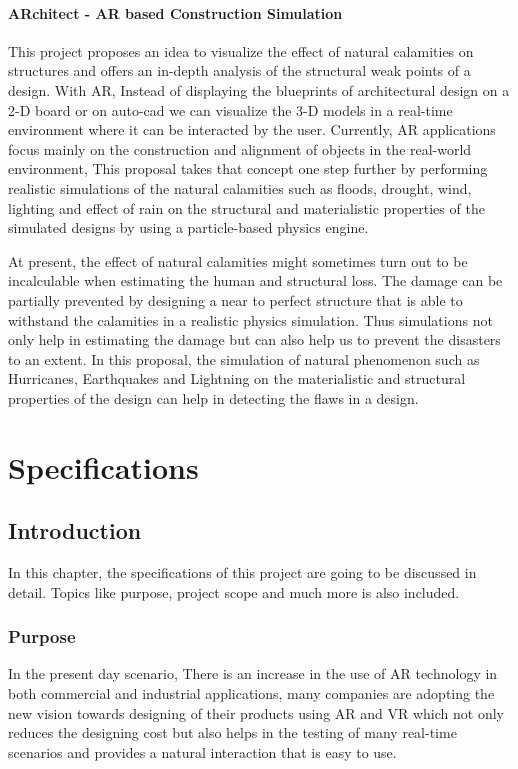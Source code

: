 \documentclass[BTech]{srmuthesis}
\begin{document}
\subsubsection{ARchitect - AR based Construction Simulation}
This project proposes an idea to visualize the effect of natural calamities on structures and offers an in-depth analysis of the structural weak points of a design. With AR, Instead of displaying the blueprints of architectural design on a 2-D board or on auto-cad we can visualize the 3-D models in a real-time environment where it can be interacted by the user. Currently, AR applications focus mainly on the construction and alignment of objects in the real-world environment, This proposal takes that concept one step further by performing realistic simulations of the natural calamities such as floods,  drought, wind, lighting and effect of rain on the structural and materialistic properties of the simulated designs by using a particle-based physics engine. 

At present, the effect of natural calamities might sometimes turn out to be incalculable when estimating the human and structural loss. The damage can be partially prevented by designing a near to perfect structure that is able to withstand the calamities in a realistic physics simulation. Thus simulations not only help in estimating the damage but can also help us to prevent the disasters to an extent. In this proposal, the simulation of natural phenomenon such as Hurricanes, Earthquakes and Lightning on the materialistic and structural properties of the design can help in detecting the flaws in a design.

\chapter{Specifications}
\section{Introduction}
In this chapter, the specifications of this project are going to be discussed in detail. Topics like purpose, project scope and much more is also included.
\subsection{Purpose}
In the present day scenario, There is an increase in the use of AR technology in both commercial and industrial applications, many companies are adopting the new vision towards designing of their products using AR and VR which not only reduces the designing cost but also helps in the testing of many real-time scenarios and provides a natural interaction that is easy to use.
\end{document}
